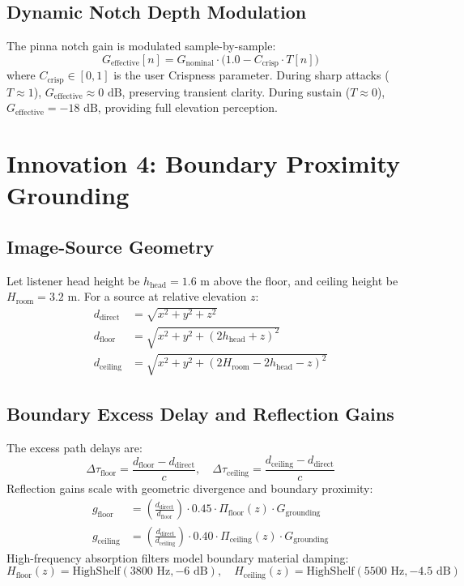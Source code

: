 \documentclass[11pt,a4paper]{article}
\begin{document}
\subsection{Dynamic Notch Depth Modulation}
The pinna notch gain is modulated sample-by-sample:
\begin{equation}
G_{\text{effective}}[n] = G_{\text{nominal}} \cdot \Big(1.0 - C_{\text{crisp}} \cdot T[n]\Big)
\end{equation}
where $C_{\text{crisp}} \in [0, 1]$ is the user Crispness parameter. During sharp attacks ($T \approx 1$), $G_{\text{effective}} \approx 0\text{ dB}$, preserving transient clarity. During sustain ($T \approx 0$), $G_{\text{effective}} = -18\text{ dB}$, providing full elevation perception.

\section{Innovation 4: Boundary Proximity Grounding}

\subsection{Image-Source Geometry}
Let listener head height be $h_{\text{head}} = 1.6\text{ m}$ above the floor, and ceiling height be $H_{\text{room}} = 3.2\text{ m}$.
For a source at relative elevation $z$:
\begin{align}
d_{\text{direct}} &= \sqrt{x^2 + y^2 + z^2} \\
d_{\text{floor}} &= \sqrt{x^2 + y^2 + (2 h_{\text{head}} + z)^2} \\
d_{\text{ceiling}} &= \sqrt{x^2 + y^2 + (2 H_{\text{room}} - 2 h_{\text{head}} - z)^2}
\end{align}

\subsection{Boundary Excess Delay and Reflection Gains}
The excess path delays are:
\begin{equation}
\Delta \tau_{\text{floor}} = \frac{d_{\text{floor}} - d_{\text{direct}}}{c}, \quad \Delta \tau_{\text{ceiling}} = \frac{d_{\text{ceiling}} - d_{\text{direct}}}{c}
\end{equation}
Reflection gains scale with geometric divergence and boundary proximity:
\begin{align}
g_{\text{floor}} &= \left(\frac{d_{\text{direct}}}{d_{\text{floor}}}\right) \cdot 0.45 \cdot \Pi_{\text{floor}}(z) \cdot G_{\text{grounding}} \\
g_{\text{ceiling}} &= \left(\frac{d_{\text{direct}}}{d_{\text{ceiling}}}\right) \cdot 0.40 \cdot \Pi_{\text{ceiling}}(z) \cdot G_{\text{grounding}}
\end{align}
High-frequency absorption filters model boundary material damping:
\begin{equation}
H_{\text{floor}}(z) = \text{HighShelf}(3800\text{ Hz}, -6\text{ dB}), \quad
H_{\text{ceiling}}(z) = \text{HighShelf}(5500\text{ Hz}, -4.5\text{ dB})
\end{equation}
\end{document}
